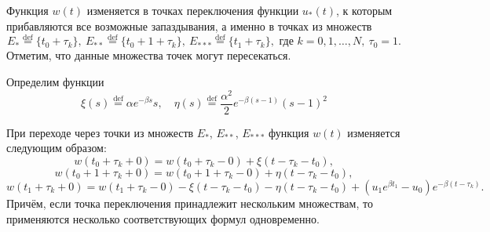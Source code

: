 Функция $w(t)$ изменяется в точках переключения функции $u_*(t)$, к которым прибавляются все возможные запаздывания, а именно в точках из множеств
%
\[E_*\stackrel{\text{def}}{=}\{t_0 + \tau_k\},\ E_{**}\stackrel{\text{def}}{=}\{t_0 + 1 + \tau_k\},\ E_{***}\stackrel{\text{def}}{=}\{t_1 + \tau_k\},\text{ где }k=0,1,\ldots,N,\ \tau_0=1.\]
%
Отметим, что данные множества точек могут пересекаться.

Определим функции 
$$\xi(s)\stackrel{\text{def}}{=}\alpha e^{-\beta s} s ,\quad \eta(s)\stackrel{\text{def}}{=}\frac{\alpha^2}{2} e^{-\beta( s-1)} (s-1)^2$$
\begin{lemma}
	\label{lm:lem_w_*}
	При переходе через точки из множеств $E_*$, $E_{**}$, $E_{***}$ функция $w(t)$ изменяется следующим образом:
	\begin{equation}
		\label{eq:w_*}
		w(t_0 + \tau_k+0) = w(t_0 + \tau_k-0) +  \xi(t-\tau_k-t_0),
	\end{equation}
	\begin{equation}
		\label{eq:w_**}
		w(t_0 +1+ \tau_k+0) = w(t_0 +1+ \tau_k-0) +\eta(t-\tau_k-t_0), 
	\end{equation}
	\begin{equation}
		\label{eq:w_***} 
		w(t_1 + \tau_k+0) = w(t_1 + \tau_k-0)-\xi(t-\tau_k-t_0)-\eta(t-\tau_k-t_0)+
		(u_1 e^{\beta t_1}-u_0)e^{-\beta(t-\tau_k)}.
	\end{equation}
	Причём, если точка переключения принадлежит нескольким множествам, то применяются несколько  соответствующих формул одновременно.
\end{lemma}

